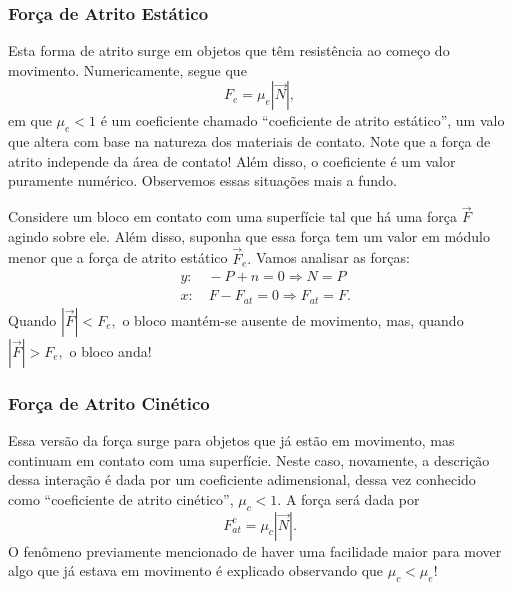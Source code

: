 \documentclass[physics_notes.tex]{subfiles}
\begin{document}
\subsubsection{Força de Atrito Estático}
Esta forma de atrito surge em objetos que têm resistência ao começo do movimento. Numericamente, segue que
$$
	F_{e} = \mu_{e}|\vec{N}|,
$$
em que $\mu_{e} < 1$ é um coeficiente chamado ``coeficiente de atrito estático'', um valo que altera com base na natureza
dos materiais de contato. Note que a força de atrito independe da área de contato! Além disso, o coeficiente é um valor
puramente numérico. Observemos essas situações mais a fundo.

Considere um bloco em contato com uma superfície tal que há uma força $\vec{F}$ agindo sobre ele. Além disso,
suponha que essa força tem um valor em módulo menor que a força de atrito estático $\vec{F}_{e}.$ Vamos analisar as forças:
\begin{align*}
	 & y:\quad -P + n = 0 \Rightarrow N = P           \\
	 & x:\quad F - F_{at} = 0 \Rightarrow F_{at} = F.
\end{align*}
Quando $|\vec{F}|<F_{e},$ o bloco mantém-se ausente de movimento, mas, quando $|\vec{F}| > F_{e},$ o bloco anda!
\subsubsection{Força de Atrito Cinético}
Essa versão da força surge para objetos que já estão em movimento, mas continuam em contato com uma superfície. Neste caso,
novamente, a descrição dessa interação é dada por um coeficiente adimensional, dessa vez conhecido como ``coeficiente de atrito
cinético'', $\mu_{c} < 1$. A força será dada por
$$
	F_{at}^{c} = \mu_{c}|\vec{N}|.
$$
O fenômeno previamente mencionado de haver uma facilidade maior para mover algo que já estava em movimento é explicado observando
que $\mu_{c} < \mu_{e}!$
\end{document}
